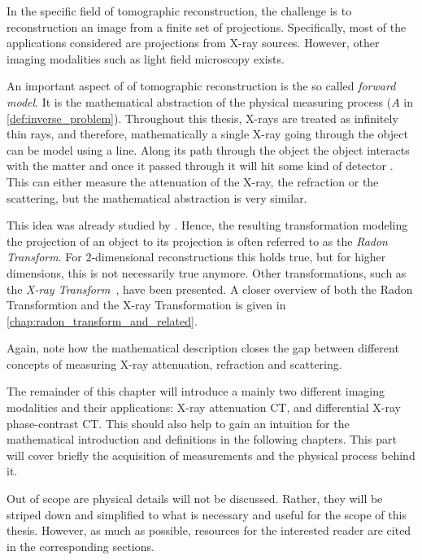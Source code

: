 In the specific field of tomographic reconstruction, the challenge is to reconstruction an image
from a finite set of projections. Specifically, most of the applications considered are projections
from X-ray sources. However, other imaging modalities such as light field microscopy exists.

An important aspect of of tomographic reconstruction is the so called \textit{forward model}. It is
the mathematical abstraction of the physical measuring process (\(A\) in
\autoref{def:inverse_problem}). Throughout this thesis, X-rays are treated as infinitely thin rays,
and therefore, mathematically a single X-ray going through the object can be model using a line.
Along its path through the object the object interacts with the matter and once it passed through it
will hit some kind of detector . This can either measure
the attenuation of the X-ray, the refraction or the scattering, but the mathematical abstraction is
very similar.

This idea was already studied by \citeauthor{radon_uber_1917}. Hence, the resulting transformation
modeling the projection of an object to its projection is often referred to as the \textit{Radon
	Transform}. For \(2\)-dimensional reconstructions this holds true, but for higher dimensions,
this is not necessarily true anymore. Other transformations, such as the \textit{X-ray
	Transform}~\cite{solmon_x-ray_1976}, have been presented. A closer overview of both the Radon
Transformtion and the X-ray Transformation is given in \autoref{chap:radon_transform_and_related}.

Again, note how the mathematical description closes the gap between different concepts of
measuring X-ray attenuation, refraction and scattering.

The remainder of this chapter will introduce a mainly two different imaging modalities and their
applications: X-ray attenuation CT, and differential X-ray phase-contrast CT\@. This should
also help to gain an intuition for the mathematical introduction and definitions in the following
chapters. This part will cover briefly the acquisition of measurements and the physical process
behind it. 

Out of scope are physical details will not be discussed. Rather, they will be striped down and
simplified to what is necessary and useful for the scope of this thesis. However, as much as
possible, resources for the interested reader are cited in the corresponding sections.

